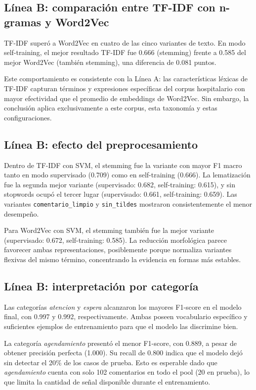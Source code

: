 \documentclass[12pt,a4paper]{article}
\newcommand{\code}[1]{\nolinkurl{#1}}
\begin{document}
\subsection{Línea B: comparación entre TF-IDF con n-gramas y Word2Vec}

TF-IDF superó a Word2Vec en cuatro de las cinco variantes de texto. En modo self-training, el mejor resultado TF-IDF fue 0.666 (stemming) frente a 0.585 del mejor Word2Vec (también stemming), una diferencia de 0.081 puntos.

Este comportamiento es consistente con la Línea A: las características léxicas de TF-IDF capturan términos y expresiones específicas del corpus hospitalario con mayor efectividad que el promedio de embeddings de Word2Vec. Sin embargo, la conclusión aplica exclusivamente a este corpus, esta taxonomía y estas configuraciones.

\subsection{Línea B: efecto del preprocesamiento}

Dentro de TF-IDF con SVM, el stemming fue la variante con mayor F1 macro tanto en modo supervisado (0.709) como en self-training (0.666). La lematización fue la segunda mejor variante (supervisado: 0.682, self-training: 0.615), y sin stopwords ocupó el tercer lugar (supervisado: 0.661, self-training: 0.659). Las variantes \code{comentario\_limpio} y \code{sin\_tildes} mostraron consistentemente el menor desempeño.

Para Word2Vec con SVM, el stemming también fue la mejor variante (supervisado: 0.672, self-training: 0.585). La reducción morfológica parece favorecer ambas representaciones, posiblemente porque normaliza variantes flexivas del mismo término, concentrando la evidencia en formas más estables.

\subsection{Línea B: interpretación por categoría}

Las categorías \textit{atencion} y \textit{espera} alcanzaron los mayores F1-score en el modelo final, con 0.997 y 0.992, respectivamente. Ambas poseen vocabulario específico y suficientes ejemplos de entrenamiento para que el modelo las discrimine bien.

La categoría \textit{agendamiento} presentó el menor F1-score, con 0.889, a pesar de obtener precisión perfecta (1.000). Su recall de 0.800 indica que el modelo dejó sin detectar el 20\% de los casos de prueba. Esto es esperable dado que \textit{agendamiento} cuenta con solo 102 comentarios en todo el pool (20 en prueba), lo que limita la cantidad de señal disponible durante el entrenamiento.
\end{document}
